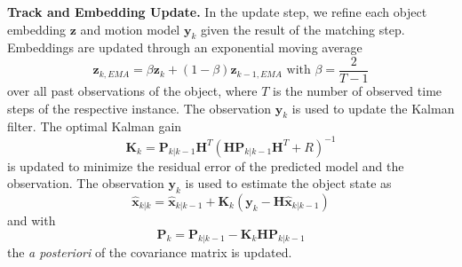 \vspace{0.5\baselineskip} \noindent \textbf{Track and Embedding Update.}
%
In the update step, we refine each object embedding $\mathbf{z}$  and motion model $\mathbf{y}_{k}$ given the result of the matching step. Embeddings are updated through an exponential moving average
\vspace*{-4pt}
\begin{equation}
    \mathbf{z}_{k, EMA}  = \beta \mathbf{z}_k + (1 - \beta) \mathbf{z}_{k-1, EMA}  \text{ with } \beta = \frac{2}{T-1}
\end{equation}
over all past observations of the object, where $T$ is the number of observed time steps of the respective instance. The observation $\mathbf{y}_{k}$ is used to update the Kalman filter. The optimal Kalman gain
\begin{equation}
   \mathbf{K}_{k} = \mathbf{P}_{k|k-1}\mathbf{H}^{T} ( \mathbf{H}\mathbf{P}_{k|k-1}\mathbf{H}^{T} + R)^{-1}
\end{equation}
is updated to minimize the residual error of the predicted model and the observation. The observation $\mathbf{y}_{k}$ is used to estimate the object state as
\begin{equation}
   \hat{\mathbf{x}}_{k|k} = \hat{\mathbf{x}}_{k|k-1} + \mathbf{K}_{k}(\mathbf{y}_{k} - \mathbf{H}\hat{\mathbf{x}}_{k|k-1}) 
\end{equation}
and with
\vspace*{-4pt}
\begin{equation}
   \mathbf{P}_{k} = \mathbf{P}_{k|k-1} - \mathbf{K}_k \mathbf{H}  \mathbf{P}_{k|k-1}
\end{equation}
the \textit{a posteriori} of the covariance matrix is updated.





